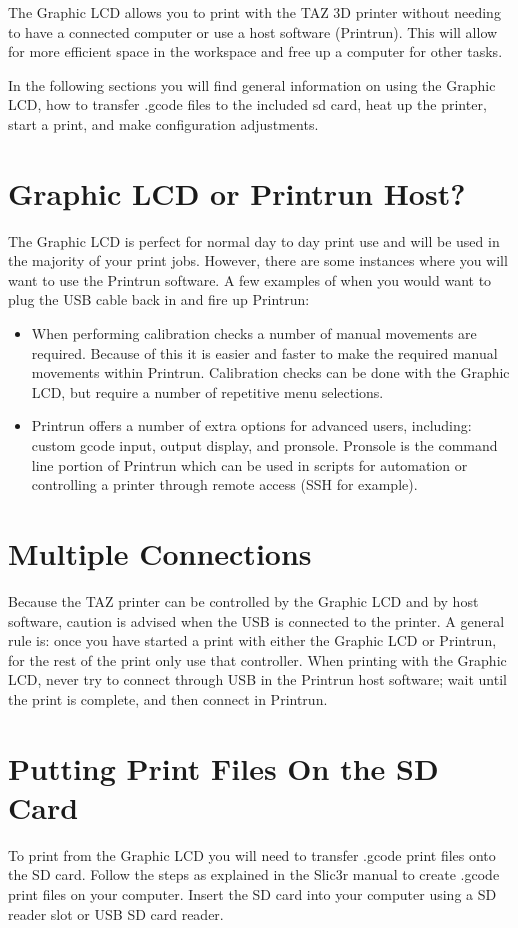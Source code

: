
The Graphic LCD allows you to print with the TAZ 3D printer without needing to have a connected computer or use a host software (Printrun). This will allow for more efficient space in the workspace and free up a computer for other tasks.

In the following sections you will find general information on using the Graphic LCD, how to transfer .gcode files to the included sd card, heat up the printer, start a print, and make configuration adjustments.

\section{Graphic LCD or Printrun Host?}
The Graphic LCD is perfect for normal day to day print use and will be used in the majority of your print jobs. However, there are some instances where you will want to use the Printrun software. A few examples of when you would want to plug the USB cable back in and fire up Printrun:
\begin{itemize}
	\item When performing calibration checks a number of manual movements are required. Because of this it is easier and faster to make the required manual movements within Printrun. Calibration checks can be done with the Graphic LCD, but require a number of repetitive menu selections.
	\item Printrun offers a number of extra options for advanced users, including: custom gcode input, output display, and pronsole. Pronsole is the command line portion of Printrun which can be used in scripts for automation or controlling a printer through remote access (SSH for example).
\end{itemize}

\section{Multiple Connections}
Because the TAZ printer can be controlled by the Graphic LCD and by host software, caution is advised when the USB is connected to the printer. A general rule is: once you have started a print with either the Graphic LCD or Printrun, for the rest of the print only use that controller. When printing with the Graphic LCD, never try to connect through USB in the Printrun host software; wait until the print is complete, and then connect in Printrun.

\section{Putting Print Files On the SD Card}
To print from the Graphic LCD you will need to transfer .gcode print files onto the SD card. Follow the steps as explained in the Slic3r manual to create .gcode print files on your computer. Insert the SD card into your computer using a SD reader slot or USB SD card reader.
